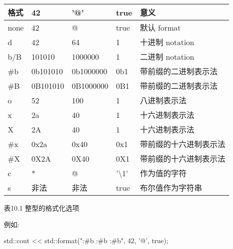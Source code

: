 \begin{longtable}[c]{|l|l|l|l|l|}
\hline
\textbf{格式} & \textbf{42} & \textbf{'@'} & \textbf{true}       & \textbf{意义}                 \\ \hline
\endfirsthead
%
\endhead
%
none           & 42          & @            & true                & 默认 format                   \\ \hline
d              & 42          & 64           & 1                   & 十进制 notation                 \\ \hline
b/B            & 101010      & 1000000      & 1                   & 二进制 notation                  \\ \hline
\#b            & 0b101010    & 0b1000000    & 0b1                 & 带前缀的二进制表示法      \\ \hline
\#B            & 0B101010    & 0B1000000    & 0B1                 & 带前缀的二进制表示法      \\ \hline
o              & 52          & 100          & 1                   & 八进制表示法                   \\ \hline
x              & 2a          & 40           & 1                   & 十六进制表示法             \\ \hline
X              & 2A          & 40           & 1                   & 十六进制表示法             \\ \hline
\#x            & 0x2a        & 0x40         & 0x1                 & 带前缀的十六进制表示法 \\ \hline
\#X            & 0X2A        & 0X40         & 0X1                 & 带前缀的十六进制表示法 \\ \hline
c              & *           & @            & '\textbackslash{}1' & 作为值的字符      \\ \hline
s              & 非法     & 非法      & true                & 布尔值作为字符串                   \\ \hline
\end{longtable}

\begin{center}
表10.1 整型的格式化选项
\end{center}

例如:

\begin{cpp}
std::cout << std::format("{:#b} {:#b} {:#b}\n", 42, '@', true);
\end{cpp}

